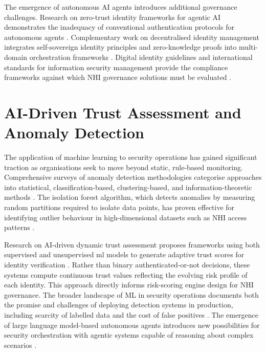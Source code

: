 The emergence of autonomous AI agents introduces additional governance challenges. Research on zero-trust identity frameworks for agentic AI demonstrates the inadequacy of conventional authentication protocols for autonomous agents \cite{Narajala2025}. Complementary work on decentralised identity management integrates self-sovereign identity principles and zero-knowledge proofs into multi-domain orchestration frameworks \cite{Bernabe2025}. Digital identity guidelines and international standards for information security management provide the compliance frameworks against which NHI governance solutions must be evaluated \cite{NIST80063, ISO27001, SOC2AICPA}.

\section[AI-Driven Anomaly Detection]{\textbf{AI-Driven Trust Assessment and Anomaly Detection}}
The application of machine learning to security operations has gained significant traction as organisations seek to move beyond static, rule-based monitoring. Comprehensive surveys of anomaly detection methodologies categorise approaches into statistical, classification-based, clustering-based, and information-theoretic methods \cite{ChandolaAnomaly2009}. The isolation forest algorithm, which detects anomalies by measuring random partitions required to isolate data points, has proven effective for identifying outlier behaviour in high-dimensional datasets such as NHI access patterns \cite{LiuIsolationForest2008}.

Research on AI-driven dynamic trust assessment proposes frameworks using both supervised and unsupervised \gls{ml} models to generate adaptive trust scores for identity verification \cite{DynamicTrust2024}. Rather than binary authenticated-or-not decisions, these systems compute continuous trust values reflecting the evolving risk profile of each identity. This approach directly informs risk-scoring engine design for NHI governance. The broader landscape of ML in security operations documents both the promise and challenges of deploying detection systems in production, including scarcity of labelled data and the cost of false positives \cite{MLSecurityOps2023}. The emergence of large language model-based autonomous agents introduces new possibilities for security orchestration with agentic systems capable of reasoning about complex scenarios \cite{AgenticAI2024}.

